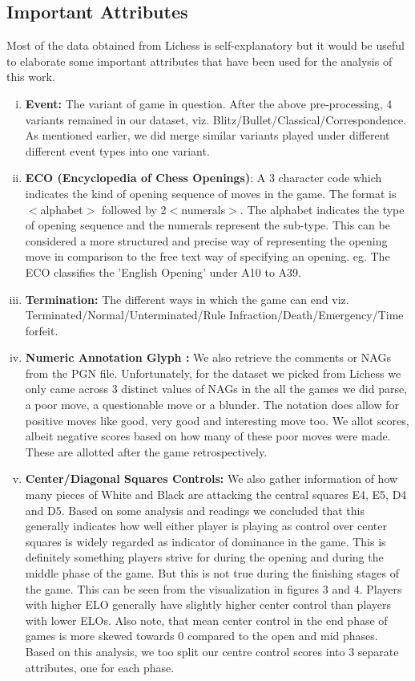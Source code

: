 \documentclass[11pt,a4paper]{article}
\begin{document}
\subsection{Important Attributes}
Most of the data obtained from Lichess is self-explanatory but it would be useful to elaborate some important attributes that have been used for the analysis of this work.
\begin{enumerate}[(i)]
    \item \textbf{Event:} The variant of game in question. After the above pre-processing, 4 variants remained in our dataset, viz. Blitz/Bullet/Classical/Correspondence. As mentioned earlier, we did merge similar variants played under different different event types into one variant.
    \item \textbf{ECO (Encyclopedia of Chess Openings)}\cite{ECO}: A 3 character code which indicates the kind of opening sequence of moves in the game. The format is $<$alphabet$>$ followed by 2$<$numerals$>$. The alphabet indicates the type of opening sequence and the numerals represent the sub-type. This can be considered a more structured and precise way of representing the opening move in comparison to the free text way of specifying an opening. eg. The ECO classifies the 'English Opening' under A10 to A39.
    \item \textbf{Termination:} The different ways in which the game can end viz. Terminated/Normal/Unterminated/Rule Infraction/Death/Emergency/Time forfeit.
    \item \textbf{Numeric Annotation Glyph \cite{NAG}:} We also retrieve the comments or NAGs from the PGN file. Unfortunately, for the dataset we picked from Lichess we only came across 3 distinct values of NAGs in the all the games we did parse, a poor move, a questionable move or a blunder. The notation does allow for positive moves like good, very good and interesting move too. We allot scores, albeit negative scores based on how many of these poor moves were made. These are allotted after the game retrospectively.
    \item \textbf{Center/Diagonal Squares Controls:} We also gather information of how many pieces of White and Black are attacking the central squares E4, E5, D4 and D5. Based on some analysis and readings we concluded that this generally indicates how well either player is playing as control over center squares is widely regarded as indicator of dominance in the game. This is definitely something players strive for during the opening and during the middle phase of the game. But this is not true during the finishing stages of the game. This can be seen from the visualization in figures 3 and 4. Players with higher ELO generally have slightly higher center control than players with lower ELOs. Also note, that mean center control in the end phase of games is more skewed towards 0 compared to the open and mid phases. Based on this analysis, we too split our centre control scores into 3 separate attributes, one for each phase. 
    

\end{enumerate}
\end{document}
